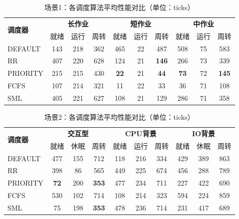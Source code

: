 \documentclass[a4paper, 12pt]{article}
\begin{document}
\begin{table}[H]
	\centering
	\caption{场景1：各调度算法平均性能对比（单位：ticks）}
	\begin{tabular}{l|ccc|ccc|ccc}
		\toprule
		\multirow{2}{*}{\textbf{调度器}} & \multicolumn{3}{c|}{\textbf{长作业}} & \multicolumn{3}{c|}{\textbf{短作业}} & \multicolumn{3}{c}{\textbf{中作业}} \\
		& 就绪 & 运行 & 周转 & 就绪 & 运行 & 周转 & 就绪 & 运行 & 周转 \\
		\midrule
		DEFAULT  & 143 & 218 & 362 & 465 & 22 & 487 & 508 & 75 & 583 \\
		RR       & 407 & 220 & 628 & 124 & 21 & \textbf{146} & 266 & 73 & 339 \\
		PRIORITY & 215 & 215 & 430 & \textbf{22} & 21 & \textbf{44} & \textbf{73} & 72 & \textbf{145} \\
		FCFS     & 107 & 214 & 321 & 11 & 22 & 33 & 36 & 71 & 108 \\
		SML      & 405 & 221 & 627 & 108 & 21 & 129 & 286 & 71 & 358 \\
		\bottomrule
	\end{tabular}
\end{table}

\begin{table}[H]
	\centering
	\caption{场景2：各调度算法平均性能对比（单位：ticks）}
	\begin{tabular}{l|ccc|ccc|ccc}
		\toprule
		\multirow{2}{*}{\textbf{调度器}} & \multicolumn{3}{c|}{\textbf{交互型}} & \multicolumn{3}{c|}{\textbf{CPU背景}} & \multicolumn{3}{c}{\textbf{IO背景}} \\
		& 就绪 & 休眠 & 周转 & 就绪 & 运行 & 周转 & 就绪 & 休眠 & 周转 \\
		\midrule
		DEFAULT  & 477 & 155 & 712 & 118 & 216 & 334 & 429 & 389 & 863 \\
		RR       & 398 & 86 & 565 & 449 & 225 & 674 & 456 & 288 & 789 \\
		PRIORITY & \textbf{72} & 200 & \textbf{353} & 477 & 234 & 711 & 227 & 422 & 690 \\
		FCFS     & 530 & 102 & 714 & 108 & 214 & 323 & 594 & 224 & 859 \\
		SML      & 75 & 198 & \textbf{353} & 478 & 236 & 714 & 231 & 417 & 689 \\
		\bottomrule
	\end{tabular}
\end{table}
\end{document}
